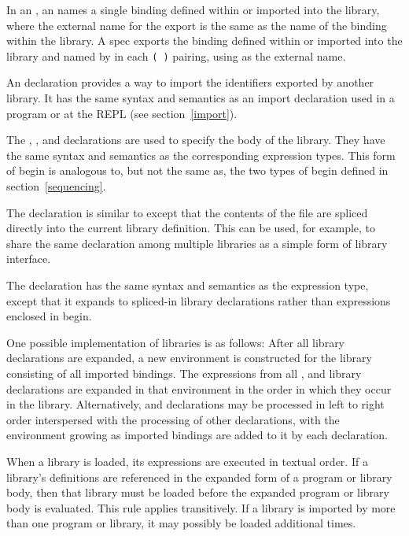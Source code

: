 In an , an  names a single
binding defined within or imported into the library, where the
external name for the export is the same as the name of the binding
within the library. A  spec exports the binding
defined within or imported into the library and named by
 in each
{\tt( )} pairing,
using  as the external name.

An  declaration provides a way to import the identifiers
exported by another library.  It has the same syntax and semantics as
an import declaration used in a program or at the REPL (see section~\ref{import}).

The , , and  declarations are
used to specify the body of
the library.  They have the same syntax and semantics as the corresponding
expression types.
This form of {\cf begin} is analogous to, but not the same as, the
two types of {\cf begin} defined in section~\ref{sequencing}.

The  declaration is similar to
 except that the contents of the file are spliced directly into the
current library definition.  This can be used, for example, to share the
same  declaration among multiple libraries as a simple
form of library interface.

The  declaration has the same syntax and semantics as
the  expression type, except that it expands to
spliced-in library declarations rather than expressions enclosed in {\cf begin}.

One possible implementation of libraries is as follows:
After all  library declarations are expanded, a new
environment is constructed for the library consisting of all
imported bindings.  The expressions
from all ,  and 
library declarations are expanded in that environment in the order in which
they occur in the library.
Alternatively,  and  declarations may be processed
in left to right order interspersed with the processing of other
declarations, with the environment growing as imported bindings are
added to it by each  declaration.

When a library is loaded, its expressions are executed
in textual order.
If a library's definitions are referenced in the expanded form of a
program or library body, then that library must be loaded before the
expanded program or library body is evaluated. This rule applies
transitively.  If a library is imported by more than one program or
library, it may possibly be loaded additional times.

